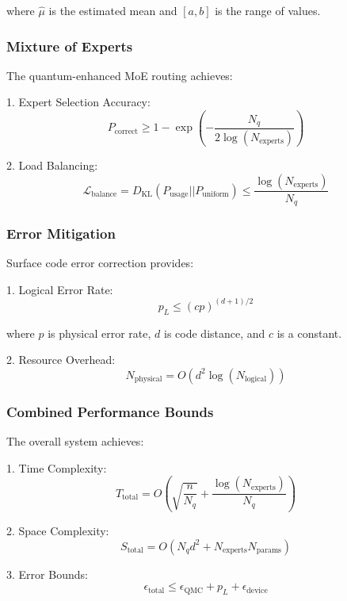 \documentclass{article}
\begin{document}
where $\hat{\mu}$ is the estimated mean and $[a,b]$ is the range of values.

\subsubsection{Mixture of Experts}
The quantum-enhanced MoE routing achieves:

1. Expert Selection Accuracy:
\begin{equation}
P_{\text{correct}} \geq 1 - \exp\left(-\frac{N_q}{2\log(N_{\text{experts}})}\right)
\end{equation}

2. Load Balancing:
\begin{equation}
\mathcal{L}_{\text{balance}} = D_{\text{KL}}(P_{\text{usage}}||P_{\text{uniform}}) \leq \frac{\log(N_{\text{experts}})}{N_q}
\end{equation}

\subsubsection{Error Mitigation}
Surface code error correction provides:

1. Logical Error Rate:
\begin{equation}
p_L \leq (cp)^{(d+1)/2}
\end{equation}

where $p$ is physical error rate, $d$ is code distance, and $c$ is a constant.

2. Resource Overhead:
\begin{equation}
N_{\text{physical}} = O(d^2\log(N_{\text{logical}}))
\end{equation}

\subsubsection{Combined Performance Bounds}
The overall system achieves:

1. Time Complexity:
\begin{equation}
T_{\text{total}} = O\left(\sqrt{\frac{n}{N_q}} + \frac{\log(N_{\text{experts}})}{N_q}\right)
\end{equation}

2. Space Complexity:
\begin{equation}
S_{\text{total}} = O(N_q d^2 + N_{\text{experts}}N_{\text{params}})
\end{equation}

3. Error Bounds:
\begin{equation}
\epsilon_{\text{total}} \leq \epsilon_{\text{QMC}} + p_L + \epsilon_{\text{device}}
\end{equation}
\end{document}
